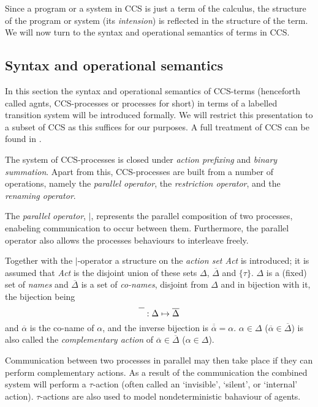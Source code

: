 Since a program or a system in CCS is just a term of the calculus, the structure of the program or system (its {\it intension\/}) is reflected in the structure of the term. We will now turn to the syntax and operational semantics of terms in CCS.


\subsection{Syntax and operational semantics}

In this section the syntax and operational semantics of CCS-terms (henceforth called agnts, CCS-processes or processes for short) in terms of a labelled transition system \cite{Plotkin} will be introduced formally. We will restrict this presentation to a subset of CCS as this suffices for our purposes. A full treatment of CCS can be found in \cite{Milner}.

The system of CCS-processes is closed under {\it action prefixing\/} and {\it binary summation}. Apart from this, CCS-processes are built from a number of operations, namely the {\it parallel operator}, the {\it restriction operator}, and the {\it renaming operator}.

The {\it parallel operator}, $\mid$, represents the parallel composition of two processes, enabeling communication to occur between them. Furthermore, the parallel operator also allows the processes behaviours to interleave freely.

Together with the $\mid$-operator a structure on the {\it action set Act\/} is introduced; it is assumed that {\it Act\/} is the disjoint union of these sets $\Delta$, $\overline{\Delta}$ and $\{\tau\}$. $\Delta$ is a (fixed) set of {\it names\/} and $\overline{\Delta}$ is a set of {\it co-names\/}, disjoint from $\Delta$ and in bijection with it, the bijection being
\begin{equation}
\overline{\rule{0cm}{.8em}\ \ } : \Delta \mapsto \overline{\Delta}
\end{equation}
and $\overline{\alpha}$ is the co-name of $\alpha$, and the inverse bijection is $\overline{\overline{\alpha}} = \alpha$. $\alpha\in\Delta$ ($\overline{\alpha}\in\overline{\Delta}$) is also called the {\it complementary action\/} of $\overline{\alpha}\in\overline{\Delta}$ ($\alpha\in\Delta$).

Communication between two processes in parallel may then take place if they can perform complementary actions. As a result of the communication the combined system will perform a $\tau$-action (often called an `invisible', `silent', or `internal' action). $\tau$-actions are also used to model nondeterministic bahaviour of agents.

